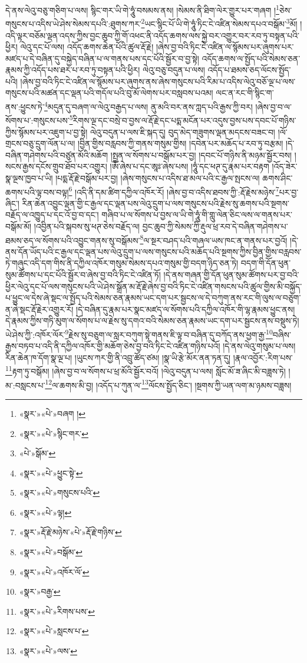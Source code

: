 དེ་ནས་ལེའུ་བཅུ་གཅིག་པ་ལས། སྙིང་གར་ཡི་གེ་ཧཱུཾ་བསམས་ནས། །སེམས་ནི་ཐིག་ལེར་གྱུར་པར་གཞག །\footnote{«སྣར་»«པེ་»བཞག །}ཅེས་གསུངས་པ་འདིས་ཡེ་ཤེས་སེམས་དཔའི་:ཐུགས་ཀར་\footnote{«སྣར་»«པེ་»སྙིང་གར་}ཡང་སྙིང་པོ་ཡི་གེ་ཧཱུཾ་ཏིང་ངེ་འཛིན་སེམས་དཔའ་བསྒོམ་\footnote{«པེ་»སྒོམ་}མོ། །འདི་ལྟར་བཅོམ་ལྡན་འདས་ཀྱིས་བྱང་ཆུབ་ཀྱི་གོ་འཕང་ནི་འདོད་ཆགས་ལས་སྐྱེ་བར་འགྱུར་བར་རབ་ཏུ་བསྟན་པའི་ཕྱིར། ལེའུ་དང་པོ་ལས། འདོད་ཆགས་ཆེན་པོའི་ཚུལ་རྡོ་རྗེ། །ཞེས་བྱ་བའི་ཏིང་ངེ་འཛིན་ལ་སྙོམས་པར་ཞུགས་པར་མཛད་པ་དེ་བཞིན་དུ་བསྐྱེད་བཞིན་པ་ལ་གནས་པས་དང་པོའི་སྦྱོར་བ་བྱ་སྟེ། འདོད་ཆགས་ལ་སྤྱོད་པའི་སེམས་ཅན་རྣམས་ཀྱི་འདོད་པས་ཐར་པ་རབ་ཏུ་བསྟན་པའི་ཕྱིར། ལེའུ་བཅུ་བདུན་པ་ལས། འདོད་པ་ཐམས་ཅད་ལོངས་སྤྱོད་པའི། །ཞེས་བྱ་བའི་ཏིང་ངེ་འཛིན་ལ་སྙོམས་པར་ཞུགས་ནས་ཞེས་གསུངས་པའི་རིམ་པ་འདིས་ལེའུ་བཅོ་ལྔ་པ་ལས་གསུངས་པའི་མཚན་དང་ལྡན་པའི་གདོལ་པའི་བུ་མོ་ལེགས་པར་བསླབས་པའམ། ལང་ན་རང་གི་སྙིང་ག་ནས་:ཕྱུངས་ཏེ་\footnote{«སྣར་»«པེ་»ཕྱུང་སྟེ་}མདུན་དུ་བཞག་ལ་ལེའུ་བརྒྱད་པ་ལས། ནུ་མའི་བར་ནས་ཀླད་པའི་རྒྱས་ཀྱི་བར། །ཞེས་བྱ་བ་ལ་སོགས་པ་:གསུངས་པས་\footnote{«སྣར་»«པེ་»གསུངས་པའི་}རིགས་ལྔ་དང་བསྲེ་བ་བྱས་ལ་རྡོ་རྗེ་དང་པདྨ་མངོན་པར་འདུས་བྱས་པས་དབང་པོ་གཉིས་ཀྱིས་སྙོམས་པར་འཇུག་པ་བྱ་སྟེ། ལེའུ་བདུན་པ་ལས་ཇི་སྐད་དུ། བུད་མེད་གཟུགས་ལྡན་མདངས་བཟང་བ། །ལོ་གྲངས་བཅུ་དྲུག་ལོན་པ་ལ། །བྱིན་གྱིས་བརླབས་ཀྱི་གནས་གསུམ་གྱིས། །དབེན་པར་མཆོད་པ་རབ་ཏུ་བརྩམ། །དེ་བཞིན་གཤེགས་པའི་བཙུན་མོའི་མཆོག །སྤྱན་ལ་སོགས་པ་བསྒོམ་པར་བྱ། །དབང་པོ་གཉིས་ནི་མཉམ་སྦྱོར་བས། །སངས་རྒྱས་དངོས་གྲུབ་ཐོབ་པར་འགྱུར། །ཨོཾ་ཞེས་པ་དང་ཨཱཿ་ཞེས་པས། །ཧཱུཾ་དང་ཕཊ་དུ་རྣམ་པར་བརྟག །འོད་ཟེར་སྣ་ལྔས་ཁྱབ་པ་ཡི། །པདྨ་རྡོ་རྗེ་བསྒོམ་པར་བྱ། །ཞེས་གསུངས་པ་འདིས་ཐ་མལ་པའི་ང་རྒྱལ་སྤངས་ལ། ཆགས་ཤིང་ཆགས་པའི་ལྟ་བས་བལྟ།\footnote{«སྣར་»«པེ་»ལྟ།} །འདི་ནི་དམ་ཚིག་དཀྱིལ་འཁོར་རོ། །ཞེས་བྱ་བ་འདིས་ཐབས་ཀྱི་:རྡོ་རྗེས་མཉེས་\footnote{«སྣར་»རྡོ་རྗེ་མཉེས་«པེ་»རྡོ་རྗེ་གཉིས་}པར་བྱ་ཞིང་། རིན་ཆེན་འབྱུང་ལྡན་གྱི་ང་རྒྱལ་དང་ལྡན་པས་ལེའུ་དྲུག་པ་ལས་གསུངས་པའི་རྗེས་སུ་ཆགས་པའི་སྔགས་བརྗོད་ལ་འཁྱུད་པ་དང་འོ་བྱ་བ་དང་། གཞིབ་པ་ལ་སོགས་པ་བྱས་ལ་ཡི་གེ་ཧཱུཾ་གི་གླུ་ལེན་ཅིང་ལས་ལ་གནས་པར་བསྒོམ་མོ། །འབྱིན་པའི་སྐབས་སུ་ཕཊ་ཅེས་བརྗོད་ལ། བྱང་ཆུབ་ཀྱི་སེམས་ཀྱི་རྡུལ་ཕྲ་རབ་དེ་བཞིན་གཤེགས་པ་ཐམས་ཅད་ལ་སོགས་པའི་འབྱུང་གནས་སུ་བསྒོམས་\footnote{«སྣར་»«པེ་»བསྒོམ་}ལ་སྔར་བཤད་པའི་གཞལ་ཡས་ཁང་ན་གནས་པར་བྱའོ། །དེ་ནས་དོན་ཡོད་པའི་ང་རྒྱལ་དང་ལྡན་པས་ལེའུ་དྲུག་པ་ལས་གསུངས་པའི་མཆོད་པའི་སྔགས་ཀྱིས་བྱིན་གྱིས་བརླབས་ཏེ་གཞུང་འདི་དག་གིས་ནི་དཀྱིལ་འཁོར་གསུམ་སེམས་དཔའ་གསུམ་གྱི་བདག་ཉིད་ཅན་ཏེ། བདག་གི་དོན་ཕུན་སུམ་ཚོགས་པ་དང་པོའི་སྦྱོར་བ་ཞེས་བྱ་བའི་ཏིང་ངེ་འཛིན་ཏོ། །དེ་ནས་གཞན་གྱི་དོན་ཕུན་སུམ་ཚོགས་པར་བྱ་བའི་ཕྱིར་ལེའུ་དང་པོ་ལས་གསུངས་པའི་ཡེ་ཤེས་སྒྲོན་མ་རྡོ་རྗེ་ཞེས་བྱ་བའི་ཏིང་ངེ་འཛིན་གསངས་པའི་ཚུལ་གྱིས་མི་བསྐྱོད་པ་ཕྱུང་ལ་དེས་ཞེ་སྡང་ལ་སྤྱོད་པའི་སེམས་ཅན་རྣམས་ཡང་དག་པར་སྦྱངས་ལ་དེ་བཀུག་ནས་རང་གི་ལུས་ལ་བཅུག་ན་ཞེ་སྡང་རྡོ་རྗེར་འགྱུར་རོ། །དེ་བཞིན་དུ་རྣམ་པར་སྣང་མཛད་ལ་སོགས་པའི་དཀྱིལ་འཁོར་གི་ལྷ་རྣམས་ཕྱུང་ནས། དེ་རྣམས་ཀྱིས་གཏི་མུག་ལ་སོགས་པ་ལ་རྗེས་སུ་དགའ་བའི་སེམས་ཅན་རྣམས་ཡང་དག་པར་སྦྱངས་ནས་བསྡུས་ཏེ། ཡེ་ཤེས་ཀྱི་:འཁོར་ལོར་\footnote{«སྣར་»«པེ་»འཁོར་ལོ་}རྗེས་སུ་བཅུག་ལ་སླར་བཀུག་སྟེ་གནས་ཇི་ལྟ་བ་བཞིན་དུ་བཀོད་ནས་ཕྱག་རྒྱ་\footnote{«སྣར་»བརྒྱ་}བཞིས་རྒྱས་བཏབ་པ་འདི་ནི་དཀྱིལ་འཁོར་གྱི་མཆོག་ཅེས་བྱ་བའི་ཏིང་ངེ་འཛིན་གཉིས་པའོ། །དེ་ནས་ལེའུ་གསུམ་པ་ལས། རིན་ཆེན་ཁ་དོག་སྣ་ལྔ་པ། །ཡུངས་ཀར་གྱི་ནི་འབྲུ་ཚོད་ཙམ། །སྣ་ཡི་རྩེ་མོར་ནན་ཏན་དུ། །རྣལ་འབྱོར་:རིག་པས་\footnote{«སྣར་»«པེ་»རིགས་པས་}རྟག་ཏུ་བསྒོམ། །ཞེས་བྱ་བ་ལ་སོགས་པ་ཕྲ་མོའི་སྦྱོར་བའོ། །ལེའུ་བདུན་པ་ལས། སློང་མོ་ཟ་ཞིང་མི་བཟླས་ཏེ། །མ་:བསླངས་པ་\footnote{«སྣར་»«པེ་»སླངས་པ་}ལ་ཆགས་མི་བྱ། །འདོད་པ་ཀུན་ལ་\footnote{«སྣར་»«པེ་»ལས་}ལོངས་སྤྱོད་ཅིང་། །སྔགས་ཀྱི་ཡན་ལག་མ་ཉམས་བཟླས། 